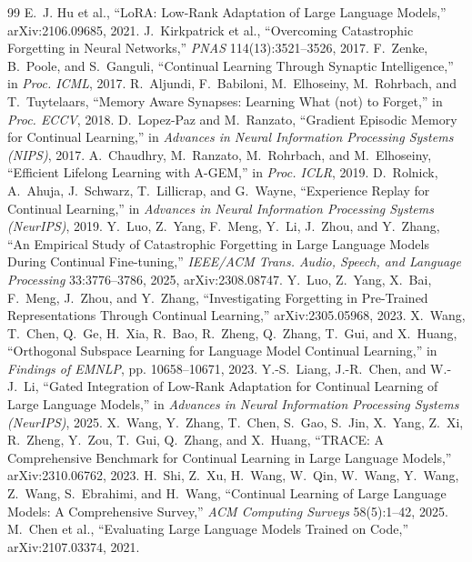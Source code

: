 \documentclass[10pt,conference]{IEEEtran}
\begin{document}
\begin{thebibliography}{99}
 E.~J. Hu et al., ``LoRA: Low-Rank Adaptation of Large Language Models,'' arXiv:2106.09685, 2021.
 J.~Kirkpatrick et al., ``Overcoming Catastrophic Forgetting in Neural Networks,'' \emph{PNAS} 114(13):3521--3526, 2017.
 F.~Zenke, B.~Poole, and S.~Ganguli, ``Continual Learning Through Synaptic Intelligence,'' in \emph{Proc. ICML}, 2017.
 R.~Aljundi, F.~Babiloni, M.~Elhoseiny, M.~Rohrbach, and T.~Tuytelaars, ``Memory Aware Synapses: Learning What (not) to Forget,'' in \emph{Proc. ECCV}, 2018.
 D.~Lopez-Paz and M.~Ranzato, ``Gradient Episodic Memory for Continual Learning,'' in \emph{Advances in Neural Information Processing Systems (NIPS)}, 2017.
 A.~Chaudhry, M.~Ranzato, M.~Rohrbach, and M.~Elhoseiny, ``Efficient Lifelong Learning with A-GEM,'' in \emph{Proc. ICLR}, 2019.
 D.~Rolnick, A.~Ahuja, J.~Schwarz, T.~Lillicrap, and G.~Wayne, ``Experience Replay for Continual Learning,'' in \emph{Advances in Neural Information Processing Systems (NeurIPS)}, 2019.
 Y.~Luo, Z.~Yang, F.~Meng, Y.~Li, J.~Zhou, and Y.~Zhang, ``An Empirical Study of Catastrophic Forgetting in Large Language Models During Continual Fine-tuning,'' \emph{IEEE/ACM Trans. Audio, Speech, and Language Processing} 33:3776--3786, 2025, arXiv:2308.08747.
 Y.~Luo, Z.~Yang, X.~Bai, F.~Meng, J.~Zhou, and Y.~Zhang, ``Investigating Forgetting in Pre-Trained Representations Through Continual Learning,'' arXiv:2305.05968, 2023.
 X.~Wang, T.~Chen, Q.~Ge, H.~Xia, R.~Bao, R.~Zheng, Q.~Zhang, T.~Gui, and X.~Huang, ``Orthogonal Subspace Learning for Language Model Continual Learning,'' in \emph{Findings of EMNLP}, pp. 10658--10671, 2023.
 Y.-S.~Liang, J.-R.~Chen, and W.-J.~Li, ``Gated Integration of Low-Rank Adaptation for Continual Learning of Large Language Models,'' in \emph{Advances in Neural Information Processing Systems (NeurIPS)}, 2025.
 X.~Wang, Y.~Zhang, T.~Chen, S.~Gao, S.~Jin, X.~Yang, Z.~Xi, R.~Zheng, Y.~Zou, T.~Gui, Q.~Zhang, and X.~Huang, ``TRACE: A Comprehensive Benchmark for Continual Learning in Large Language Models,'' arXiv:2310.06762, 2023.
 H.~Shi, Z.~Xu, H.~Wang, W.~Qin, W.~Wang, Y.~Wang, Z.~Wang, S.~Ebrahimi, and H.~Wang, ``Continual Learning of Large Language Models: A Comprehensive Survey,'' \emph{ACM Computing Surveys} 58(5):1--42, 2025.
 M.~Chen et al., ``Evaluating Large Language Models Trained on Code,'' arXiv:2107.03374, 2021.

\end{thebibliography}
\end{document}
